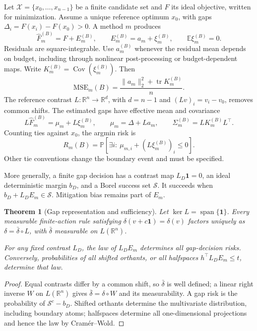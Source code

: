 \documentclass[a4paper,onecolumn,unpublished,nopdfoutputerror]{quantumarticle}
\theoremstyle{plain}
\newtheorem{theorem}{Theorem}[section]
\theoremstyle{definition}
\newcommand{\E}{\mathbb{E}}
\newcommand{\Prob}{\mathbb{P}}
\newcommand{\Cov}{\operatorname{Cov}}
\newcommand{\tr}{\operatorname{tr}}
\newcommand{\calX}{\mathcal{X}}
\newcommand{\calS}{\mathcal{S}}
\newcommand{\MSE}{\mathrm{MSE}}
\newcommand{\linspan}{\operatorname{span}}
\newcommand{\R}{\mathbb{R}}
\newcommand{\1}{\mathbf{1}}
\begin{document}
Let $\calX=\{x_0,\ldots,x_{n-1}\}$ be a finite candidate set and $F$ its ideal objective, written for minimization. Assume a unique reference optimum $x_0$, with gaps $\Delta_i=F(x_i)-F(x_0)>0$. A method $m$ produces
\[
\widehat F_m^{(B)}=F+E_m^{(B)},\qquad E_m^{(B)}=a_m+\xi_m^{(B)},\qquad \E\xi_m^{(B)}=0.
\]
Residuals are square-integrable. Use $a_m^{(B)}$ whenever the residual mean depends on budget, including through nonlinear post-processing or budget-dependent maps. Write $K_m^{(B)}=\Cov(\xi_m^{(B)})$. Then
\begin{equation}\label{eq:mse_v6}
\MSE_m(B)=\frac{\|a_m\|_2^2+\tr K_m^{(B)}}{n}.
\end{equation}
The reference contrast $L:\R^n\to\R^d$, with $d=n-1$ and $(Lv)_i=v_i-v_0$, removes common shifts. The estimated gaps have effective mean and covariance
\begin{equation}\label{eq:gap_model}
L\widehat F_m^{(B)}=\mu_m+L\xi_m^{(B)},\qquad
\mu_m=\Delta+La_m,\qquad \Sigma_m^{(B)}=LK_m^{(B)}L^\top.
\end{equation}
Counting ties against $x_0$, the argmin risk is
\begin{equation}\label{eq:argmin_risk}
R_m(B)=\Prob[\exists i:\ \mu_{m,i}+(L\xi_m^{(B)})_i\le0].
\end{equation}
Other tie conventions change the boundary event and must be specified.

More generally, a finite gap decision has a contrast map $L_D\1=0$, an ideal deterministic margin $b_D$, and a Borel success set $\calS$. It succeeds when $b_D+L_DE_m\in\calS$. Mitigation bias remains part of $E_m$.

\begin{theorem}[Gap representation and sufficiency]
\label{thm:quotient_factorization}\label{thm:minimal_gap_law}\label{thm:gap_law_iff}
Let $\ker L=\linspan\{\1\}$. Every measurable finite-action rule satisfying $\delta(v+c\1)=\delta(v)$ factors uniquely as $\delta=\bar\delta\circ L$, with $\bar\delta$ measurable on $L(\R^n)$.

For any fixed contrast $L_D$, the law of $L_DE_m$ determines all gap-decision risks. Conversely, probabilities of all shifted orthants, or all halfspaces $h^\top L_DE_m\le t$, determine that law.
\end{theorem}

\begin{proof}
Equal contrasts differ by a common shift, so $\bar\delta$ is well defined; a linear right inverse $W$ on $L(\R^n)$ gives $\bar\delta=\delta\circ W$ and its measurability. A gap risk is the probability of $\calS^c-b_D$. Shifted orthants determine the multivariate distribution, including boundary atoms; halfspaces determine all one-dimensional projections and hence the law by Cram\'er--Wold.
\end{proof}
\end{document}
